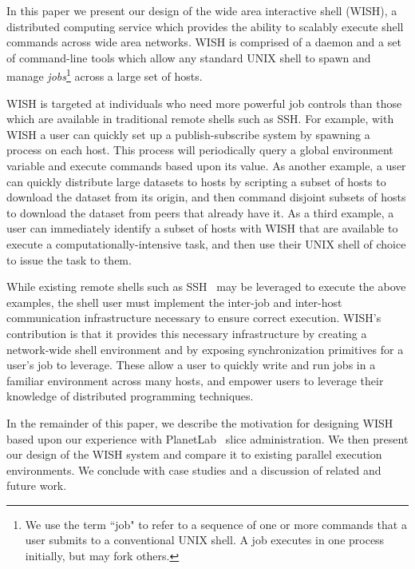  \label{sec:intro}

In this paper we present our design of the wide area interactive shell (WISH),
a distributed computing service which provides the ability to scalably execute
shell commands across wide area networks. WISH is comprised of  a daemon and a
set of command-line tools which allow any standard UNIX shell to spawn and
manage \emph{jobs}\footnote{We use the term ``job" to refer to a sequence of
one or more commands that a user submits to a conventional UNIX shell.  A job
executes in one process initially, but may fork others.} across a large set of
hosts.

WISH is targeted at individuals who need more powerful job controls than those
which are available in  traditional remote shells such as SSH.  For example,
with WISH a user can quickly set up a publish-subscribe system by spawning a
process on each host.  This process will periodically query a global
environment variable and execute commands based upon its value.  As another
example, a user can quickly distribute large datasets to hosts by scripting a
subset of hosts to download the dataset from its origin, and then command
disjoint subsets of hosts to download the dataset from peers that already have
it.  As a third example, a user can immediately identify a subset of hosts
with WISH that are available to execute a computationally-intensive task, and
then use their UNIX shell of choice to issue the task to them.

While existing remote shells such as SSH~\cite{OpenSSH} may be leveraged to
execute the above examples, the shell user must implement the inter-job and
inter-host communication infrastructure necessary to ensure correct execution.
WISH's contribution is that it provides this necessary infrastructure by
creating a network-wide shell environment and by exposing synchronization
primitives for a user's job to leverage.  These allow a user to quickly write
and run jobs in a familiar environment across many hosts, and empower users to
leverage their knowledge of distributed programming techniques.

In the remainder of this paper, we describe the motivation for designing WISH
based upon our experience with PlanetLab~\cite{PlanetLab-architecture} slice
administration.  We then present our design of the WISH system and compare it
to existing parallel execution environments.  We conclude with case studies
and a discussion of related and future work.

